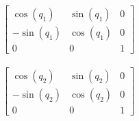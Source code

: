 \documentclass[a4paper,14pt]{extreport}
\begin{document}
\begin{align*}
\left[
\begin{matrix}\cos{\left (q_{1} \right )} & \sin{\left (q_{1} \right )} & 0\\- \sin{\left (q_{1} \right )} & \cos{\left (q_{1} \right )} & 0\\0 & 0 & 1
\end{matrix}
\right]
\end{align*}

\begin{align*}
\left[\begin{matrix}\cos{\left (q_{2} \right )} & \sin{\left (q_{2} \right )} & 0\\- \sin{\left (q_{2} \right )} & \cos{\left (q_{2} \right )} & 0\\0 & 0 & 1\end{matrix}\right]
\end{align*}
\end{document}
